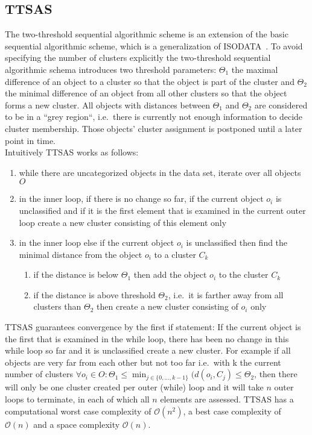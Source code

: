 \subsection{TTSAS}\label{\positionnumber}
The two-threshold sequential algorithmic scheme is an extension of the basic sequential algorithmic scheme, which is a generalization of ISODATA~\cite{ball1967clustering, THEODORIDIS2009627}. To avoid specifying the number of clusters explicitly the two-threshold sequential algorithmic schema introduces two threshold parameters: $\Theta_1$ the maximal difference of an object to a cluster so that the object is part of the cluster and $\Theta_2$ the minimal difference of an object from all other clusters so that the object forms a new cluster. All objects with distances between $\Theta_1$ and $\Theta_2$ are considered to be in a ``grey region``, i.e.~there is currently not enough information to decide cluster membership. Those objects' cluster assignment is postponed until a later point in time. \\
Intuitively TTSAS works as follows:
\begin{enumerate}
    \item while there are uncategorized objects in the data set, iterate over all objects $O$
    \item in the inner loop, if there is no change so far, if the current object $o_i$ is unclassified and if it is the first element that is examined in the current outer loop create a new cluster consisting of this element only
    \item in the inner loop else if the current object $o_i$ is unclassified then find the minimal distance from the object $o_i$ to a cluster $C_k$
    \begin{enumerate}
        \item if the distance is below $\Theta_1$ then add the object $o_i$ to the cluster $C_k$
        \item if the distance is above threshold $\Theta_2$, i.e.~it is farther away from all clusters than $\Theta_2$ then create a new cluster consisting of $o_i$ only
    \end{enumerate}
\end{enumerate}
TTSAS guarantees convergence by the first if statement: If the current object is the first that is examined in the while loop, there has been no change in this while loop so far and it is unclassified create a new cluster. For example if all objects are very far from each other but not too far i.e.~with k the current number of clusters $\forall o_i \in O: \Theta_1 \leq \min_{j \in \{0, \dots, k-1\}}(d(o_i, C_j) \leq \Theta_2$, then there will only be one cluster created per outer (while) loop and it will take $n$ outer loops to terminate, in each of which all $n$ elements are assessed.
TTSAS has a computational worst case complexity of $\mathcal{O}(n^2)$, a best case complexity of $\mathcal{O}(n)$ and a space complexity $\mathcal{O}(n)$. \\


